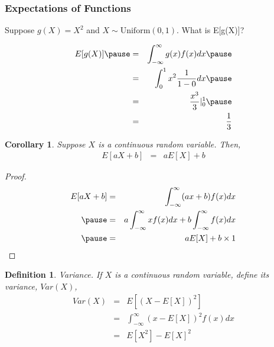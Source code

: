 \documentclass{beamer}
\newtheorem{defn}{Definition}
\newtheorem{cor}{Corollary}
\numberwithin{equation}{section}
\begin{document}
\begin{frame}
\frametitle{Expectations of Functions} 

Suppose $g(X) = X^2$  and $X \sim \text{Uniform}(0,1)$.  What is E[g(X)]? \pause 

\begin{eqnarray}
E[g(X)] \pause  & = & \int_{-\infty}^{\infty} g(x)f(x)dx \nonumber \pause  \\
& = & \int_{0}^{1} x^2 \frac{1}{1-0}dx \nonumber  \pause \\
& = & \frac{x^3}{3}|^{1}_{0} \nonumber  \pause \\
& = & \frac{1}{3} \nonumber 
\end{eqnarray}


\end{frame}


\begin{frame}

\begin{cor} 
Suppose $X$ is a continuous random variable.  Then, 
\begin{eqnarray}
E[aX + b] & = & aE[X] + b\nonumber 
\end{eqnarray}
\end{cor}
\pause 

\begin{proof}
\begin{eqnarray}
E[aX + b] & = & \int_{-\infty}^{\infty} (a x + b)f(x) dx \nonumber \\ \pause 
& = & a \int_{-\infty}^{\infty} x f(x) dx + b \int_{-\infty}^{\infty} f(x)dx \nonumber \\ \pause 
& = & a E[X]  + b \times 1 \nonumber 
\end{eqnarray}


\end{proof}


\end{frame}




\begin{frame}


\begin{defn} 
Variance.  If $X$ is a continuous random variable, define its variance, $Var(X)$, 
\begin{eqnarray}
Var(X) & = & E[(X- E[X])^2] \nonumber \\
& = & \int_{-\infty}^{\infty} (x - E[X])^2f(x) dx \nonumber \\
& = & E[X^2] - E[X]^2 \nonumber 
\end{eqnarray}
\end{defn}

\end{frame}
\end{document}
